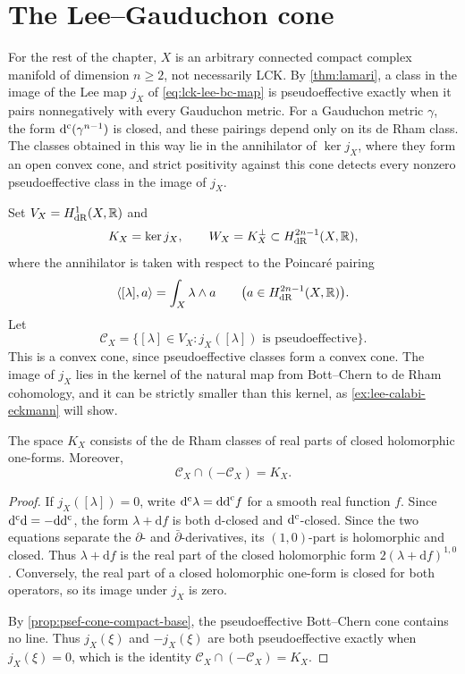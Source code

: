 \section{The Lee--Gauduchon cone}
\label{sec:lee-gauduchon-cone}

For the rest of the chapter, $X$ is an arbitrary connected compact complex manifold of dimension $n\geq2$, not necessarily LCK. By \cref{thm:lamari}, a class in the image of the Lee map $j_X$ of \eqref{eq:lck-lee-bc-map} is pseudoeffective exactly when it pairs nonnegatively with every Gauduchon metric. For a Gauduchon metric $\gamma$, the form $\mathrm d^{\mathrm c}(\gamma^{n-1})$ is closed, and these pairings depend only on its de Rham class. The classes obtained in this way lie in the annihilator of $\ker j_X$, where they form an open convex cone, and strict positivity against this cone detects every nonzero pseudoeffective class in the image of $j_X$.

Set $V_X=H^1_{\mathrm{dR}}(X,\mathbb R)$ and
\[
 K_X=\ker j_X,\qquad
 W_X=K_X^\perp\subset H^{2n-1}_{\mathrm{dR}}(X,\mathbb R),
\]
where the annihilator is taken with respect to the Poincar\'e pairing
\[
 \langle[\lambda],a\rangle=\int_X\lambda\wedge a
 \qquad\bigl(a\in H^{2n-1}_{\mathrm{dR}}(X,\mathbb R)\bigr).
\]
Let
\[
 \mathcal C_X
 =\{[\lambda]\in V_X:j_X([\lambda])\text{ is pseudoeffective}\}.
\]
This is a convex cone, since pseudoeffective classes form a convex cone. The image of $j_X$ lies in the kernel of the natural map from Bott--Chern to de Rham cohomology, and it can be strictly smaller than this kernel, as \cref{ex:lee-calabi-eckmann} will show.

\begin{lemma}\label{lem:lee-gauduchon-kernel}
The space $K_X$ consists of the de Rham classes of real parts of closed holomorphic one-forms. Moreover,
\[
 \mathcal C_X\cap(-\mathcal C_X)=K_X.
\]
\end{lemma}
\begin{proof}
If $j_X([\lambda])=0$, write $\mathrm d^{\mathrm c}\lambda=\mathrm{dd}^{\mathrm{c}} f$ for a smooth real function $f$. Since $\mathrm d^{\mathrm c}\mathrm{d}=-\mathrm{d}\mathrm d^{\mathrm c}$, the form $\lambda+\mathrm{d}f$ is both $\mathrm{d}$-closed and $\mathrm d^{\mathrm c}$-closed. Since the two equations separate the $\partial$- and $\bar\partial$-derivatives, its $(1,0)$-part is holomorphic and closed. Thus $\lambda+\mathrm{d}f$ is the real part of the closed holomorphic form $2(\lambda+\mathrm{d}f)^{1,0}$. Conversely, the real part of a closed holomorphic one-form is closed for both operators, so its image under $j_X$ is zero.

By \cref{prop:psef-cone-compact-base}, the pseudoeffective Bott--Chern cone contains no line. Thus $j_X(\xi)$ and $-j_X(\xi)$ are both pseudoeffective exactly when $j_X(\xi)=0$, which is the identity $\mathcal C_X\cap(-\mathcal C_X)=K_X$.
\end{proof}

